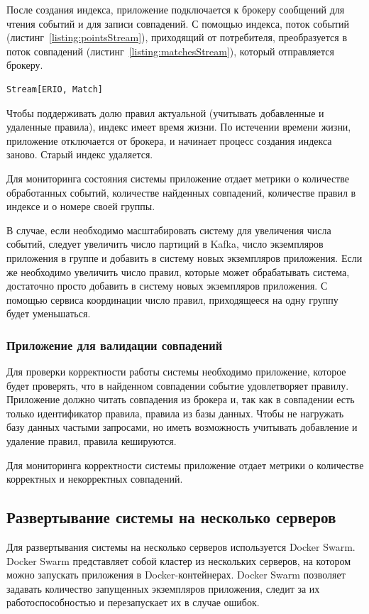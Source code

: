 \documentclass[14pt]{article}
\begin{document}
После создания индекса, приложение подключается к брокеру сообщений для чтения событий и для записи совпадений. С помощью индекса, поток событий (листинг~\ref{listing:pointsStream}), приходящий от потребителя, преобразуется в поток совпадений (листинг~\ref{listing:matchesStream}), который отправляется брокеру.

\begin{lstlisting}[style=scalaStyle,caption={Тип, описывающий поток совпадений.},label={listing:matchesStream},captionpos=b, float]
Stream[ERIO, Match]
\end{lstlisting}

Чтобы поддерживать долю правил актуальной (учитывать добавленные и удаленные правила), индекс имеет время жизни. По истечении времени жизни, приложение отключается от брокера, и начинает процесс создания индекса заново. Старый индекс удаляется.

\bigskip
\bigskip

Для мониторинга состояния системы приложение отдает метрики о количестве обработанных событий, количестве найденных совпадений, количестве правил в индексе и о номере своей группы.

В случае, если необходимо масштабировать систему для увеличения числа событий, следует увеличить число партиций в Kafka, число экземпляров приложения в группе и добавить в систему новых экземпляров приложения. Если же необходимо увеличить число правил, которые может обрабатывать система, достаточно просто добавить в систему новых экземпляров приложения. С помощью сервиса координации число правил, приходящееся на одну группу будет уменьшаться.

\subsubsection{Приложение для валидации совпадений}
Для проверки корректности работы системы необходимо приложение, которое будет проверять, что в найденном совпадении событие удовлетворяет правилу. Приложение должно читать совпадения из брокера и, так как в совпадении есть только идентификатор правила, правила из базы данных. Чтобы не нагружать базу данных частыми запросами, но иметь возможность учитывать добавление и удаление правил, правила кешируются.

Для мониторинга корректности системы приложение отдает метрики о количестве корректных и некорректных совпадений.

\subsection{Развертывание системы на несколько серверов}
Для развертывания системы на несколько серверов используется Docker Swarm. Docker Swarm представляет собой кластер из нескольких серверов, на котором можно запускать приложения в Docker-контейнерах. Docker Swarm позволяет задавать количество запущенных экземпляров приложения, следит за их работоспособностью и перезапускает их в случае ошибок.
\end{document}

